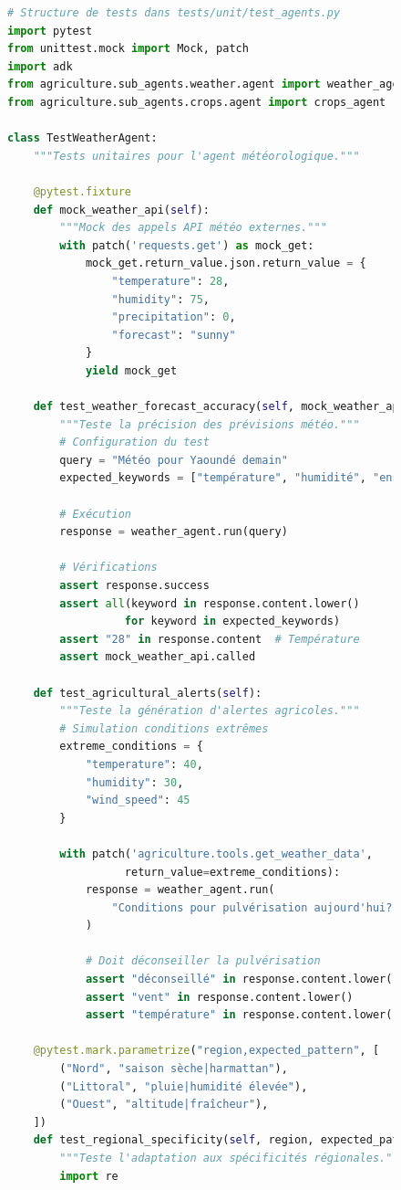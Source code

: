 \begin{figure}[H]
\centering
\begin{lstlisting}[language=Python, caption=Framework de tests unitaires pour agents ADK]
# Structure de tests dans tests/unit/test_agents.py
import pytest
from unittest.mock import Mock, patch
import adk
from agriculture.sub_agents.weather.agent import weather_agent
from agriculture.sub_agents.crops.agent import crops_agent

class TestWeatherAgent:
    """Tests unitaires pour l'agent météorologique."""

    @pytest.fixture
    def mock_weather_api(self):
        """Mock des appels API météo externes."""
        with patch('requests.get') as mock_get:
            mock_get.return_value.json.return_value = {
                "temperature": 28,
                "humidity": 75,
                "precipitation": 0,
                "forecast": "sunny"
            }
            yield mock_get

    def test_weather_forecast_accuracy(self, mock_weather_api):
        """Teste la précision des prévisions météo."""
        # Configuration du test
        query = "Météo pour Yaoundé demain"
        expected_keywords = ["température", "humidité", "ensoleillé"]

        # Exécution
        response = weather_agent.run(query)

        # Vérifications
        assert response.success
        assert all(keyword in response.content.lower()
                  for keyword in expected_keywords)
        assert "28" in response.content  # Température
        assert mock_weather_api.called

    def test_agricultural_alerts(self):
        """Teste la génération d'alertes agricoles."""
        # Simulation conditions extrêmes
        extreme_conditions = {
            "temperature": 40,
            "humidity": 30,
            "wind_speed": 45
        }

        with patch('agriculture.tools.get_weather_data',
                  return_value=extreme_conditions):
            response = weather_agent.run(
                "Conditions pour pulvérisation aujourd'hui?"
            )

            # Doit déconseiller la pulvérisation
            assert "déconseillé" in response.content.lower()
            assert "vent" in response.content.lower()
            assert "température" in response.content.lower()

    @pytest.mark.parametrize("region,expected_pattern", [
        ("Nord", "saison sèche|harmattan"),
        ("Littoral", "pluie|humidité élevée"),
        ("Ouest", "altitude|fraîcheur"),
    ])
    def test_regional_specificity(self, region, expected_pattern):
        """Teste l'adaptation aux spécificités régionales."""
        import re


\end{lstlisting}
\end{figure}
